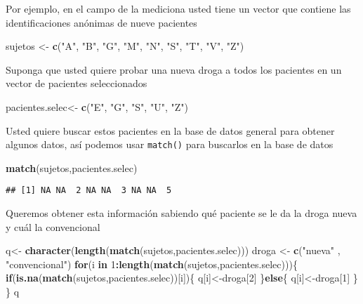 \documentclass[]{article}
\newenvironment{Shaded}{\begin{snugshade}}{\end{snugshade}}
\newcommand{\KeywordTok}[1]{\textcolor[rgb]{0.13,0.29,0.53}{\textbf{#1}}}
\newcommand{\DecValTok}[1]{\textcolor[rgb]{0.00,0.00,0.81}{#1}}
\newcommand{\StringTok}[1]{\textcolor[rgb]{0.31,0.60,0.02}{#1}}
\newcommand{\ControlFlowTok}[1]{\textcolor[rgb]{0.13,0.29,0.53}{\textbf{#1}}}
\newcommand{\OperatorTok}[1]{\textcolor[rgb]{0.81,0.36,0.00}{\textbf{#1}}}
\newcommand{\NormalTok}[1]{#1}
\begin{document}
Por ejemplo, en el campo de la mediciona usted tiene un vector que
contiene las identificaciones anónimas de nueve pacientes

\begin{Shaded}
\begin{Highlighting}[]
\NormalTok{sujetos <-}\StringTok{ }\KeywordTok{c}\NormalTok{(}\StringTok{"A"}\NormalTok{, }\StringTok{"B"}\NormalTok{, }\StringTok{"G"}\NormalTok{, }\StringTok{"M"}\NormalTok{, }\StringTok{"N"}\NormalTok{, }\StringTok{"S"}\NormalTok{, }\StringTok{"T"}\NormalTok{, }\StringTok{"V"}\NormalTok{, }\StringTok{"Z"}\NormalTok{)}
\end{Highlighting}
\end{Shaded}

Suponga que usted quiere probar una nueva droga a todos los pacientes en
un vector de pacientes seleccionados

\begin{Shaded}
\begin{Highlighting}[]
\NormalTok{pacientes.selec<-}\StringTok{ }\KeywordTok{c}\NormalTok{(}\StringTok{"E"}\NormalTok{, }\StringTok{"G"}\NormalTok{, }\StringTok{"S"}\NormalTok{, }\StringTok{"U"}\NormalTok{, }\StringTok{"Z"}\NormalTok{)}
\end{Highlighting}
\end{Shaded}

Usted quiere buscar estos pacientes en la base de datos general para
obtener algunos datos, así podemos usar \texttt{match()} para buscarlos
en la base de datos

\begin{Shaded}
\begin{Highlighting}[]
\KeywordTok{match}\NormalTok{(sujetos,pacientes.selec)}
\end{Highlighting}
\end{Shaded}

\begin{verbatim}
## [1] NA NA  2 NA NA  3 NA NA  5
\end{verbatim}

Queremos obtener esta información sabiendo qué paciente se le da la
droga nueva y cuál la convencional

\begin{Shaded}
\begin{Highlighting}[]
\NormalTok{q<-}\StringTok{ }\KeywordTok{character}\NormalTok{(}\KeywordTok{length}\NormalTok{(}\KeywordTok{match}\NormalTok{(sujetos,pacientes.selec)))}
\NormalTok{droga <-}\StringTok{ }\KeywordTok{c}\NormalTok{(}\StringTok{"nueva"}\NormalTok{ , }\StringTok{"convencional"}\NormalTok{)}
\ControlFlowTok{for}\NormalTok{(i }\ControlFlowTok{in} \DecValTok{1}\OperatorTok{:}\KeywordTok{length}\NormalTok{(}\KeywordTok{match}\NormalTok{(sujetos,pacientes.selec)))\{}
  \ControlFlowTok{if}\NormalTok{(}\KeywordTok{is.na}\NormalTok{(}\KeywordTok{match}\NormalTok{(sujetos,pacientes.selec))[i])\{}
\NormalTok{    q[i]<-droga[}\DecValTok{2}\NormalTok{]}
\NormalTok{  \}}\ControlFlowTok{else}\NormalTok{\{}
\NormalTok{    q[i]<-droga[}\DecValTok{1}\NormalTok{]}
\NormalTok{  \}}
\NormalTok{\}}
\NormalTok{q}
\end{Highlighting}
\end{Shaded}
\end{document}
